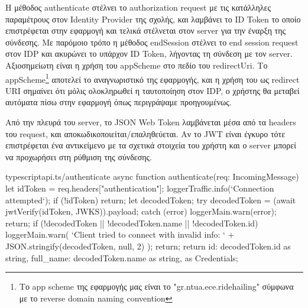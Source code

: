 \documentclass[../thesis.tex]{subfiles}
\begin{document}
Η μέθοδος authenticate στέλνει το authorization request με τις κατάλληλες παραμέτρους στον Identity Provider της σχολής, και λαμβάνει το ID Token το οποίο επιστρέφεται στην εφαρμογή και τελικά στέλνεται στον server για την έναρξη της σύνδεσης.
Με παρόμοιο τρόπο η μέθοδος endSession στέλνει το end session request στον IDP και ακυρώνει το υπάρχον ID Token, λήγοντας τη σύνδεση με τον server.
Αξιοσημείωτη είναι η χρήση του appScheme στο πεδίο του redirectUri.
Το appScheme\footnote{Το app scheme της εφαρμογής μας είναι το "gr.ntua.ece.ridehailing" σύμφωνα με το reverse domain naming convention} αποτελεί το αναγνωριστικό της εφαρμογής, και η χρήση του ως redirect URI σημαίνει ότι μόλις ολοκληρωθεί η ταυτοποίηση στον IDP, ο χρήστης θα μεταβεί αυτόματα πίσω στην εφαρμογή όπως περιγράψαμε προηγουμένως.

Από την πλευρά του server, το JSON Web Token λαμβάνεται μέσα από τα headers του request, και αποκωδικοποιείται/επαληθεύεται.
Αν το JWT είναι έγκυρο τότε επιστρέφεται ένα αντικείμενο με τα σχετικά στοιχεία του χρήστη και ο server μπορεί να προχωρήσει στη ρύθμιση της σύνδεσης.

\begin{codeblock}{typescript}{api.ts/authenticate}
  async function authenticate(req: IncomingMessage) {
    let idToken = req.headers["authentication"];
    loggerTraffic.info(`Connection attempted`);
    if (!idToken) return;
    let decodedToken;
    try {
      decodedToken = (await jwtVerify(idToken, JWKS)).payload;
    } catch (error) {
      loggerMain.warn(error);
      return;
    }
    if (!decodedToken || !decodedToken.name || !decodedToken.id) {
      loggerMain.warn(
        `Client tried to connect with invalid info: ` +
          JSON.stringify(decodedToken, null, 2)
      );
      return;
    }
    return {
      id: decodedToken.id as string,
      full_name: decodedToken.name as string,
    } as Credentials;
  }
\end{codeblock}
\end{document}
